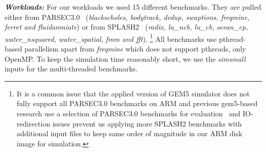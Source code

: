 \begin{table}
{\begin{tabular}{ p{2cm} | p{7cm} | p{4cm} | p{2cm} }
    \hline
  \end{tabular}}
\end{table}

\textbf{\textit{Workloads:}} For our workloads we used 15 different benchmarks. They are pulled either from PARSEC3.0~\cite{bienia11benchmarking} ({\it blackscholes, bodytrack, dedup, swaptions, freqmine, ferret and fluidanmiate}) or from SPLASH2~\cite{woo1995splash} ({\it radix, lu\_ncb, lu\_cb, ocean\_cp, water\_nsquared, water\_spatial, fmm and fft}). 
\footnote{It is a common issue that the applied version of GEM5 simulator does not fully support all PARSEC3.0 benchmarks on ARM and previous gem5-based research use a selection of PARSEC3.0 benchmarks for evaluation~\cite{endo2014micro,gallego2016dram,van2013full} and IO-redirection issues prevent us applying more SPLASH2 benchmarks with additional input files to keep same order of magnitude in our ARM disk image for simulation.}
All benchmarks use pthread-based parallelism apart from \emph{freqmine} which does not support pthreads, only OpenMP. To keep the simulation time reasonably short, we use the \emph{simsmall} inputs for the multi-threaded benchmarks.

